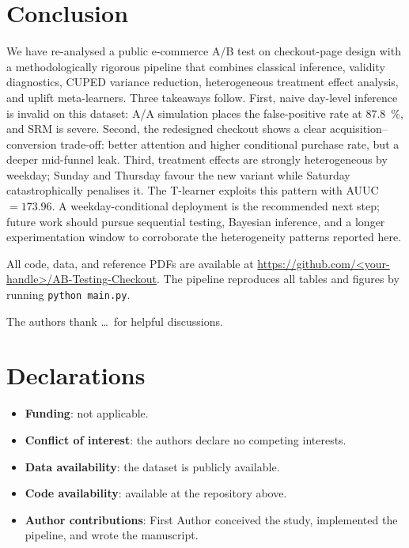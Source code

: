 \documentclass[pdflatex,sn-mathphys-num]{sn-jnl}
\theoremstyle{thmstyleone}
\theoremstyle{thmstyletwo}
\theoremstyle{thmstylethree}
\begin{document}
\section{Conclusion}\label{sec:conclusion}

We have re-analysed a public e-commerce A/B test on checkout-page design with
a methodologically rigorous pipeline that combines classical inference,
validity diagnostics, CUPED variance reduction, heterogeneous treatment effect
analysis, and uplift meta-learners.
Three takeaways follow.
First, naive day-level inference is invalid on this dataset:
A/A simulation places the false-positive rate at \SI{87.8}{\percent}, and SRM is severe.
Second, the redesigned checkout shows a clear acquisition--conversion trade-off:
better attention and higher conditional purchase rate, but a deeper mid-funnel leak.
Third, treatment effects are strongly heterogeneous by weekday;
Sunday and Thursday favour the new variant while Saturday catastrophically
penalises it. The T-learner exploits this pattern with AUUC $=173.96$.
A weekday-conditional deployment is the recommended next step;
future work should pursue sequential testing, Bayesian inference, and a longer
experimentation window to corroborate the heterogeneity patterns reported here.

\backmatter


All code, data, and reference PDFs are available at \url{https://github.com/<your-handle>/AB-Testing-Checkout}.
The pipeline reproduces all tables and figures by running \texttt{python main.py}.


The authors thank \dots\ for helpful discussions.

\section*{Declarations}
\begin{itemize}
\item \textbf{Funding}: not applicable.
\item \textbf{Conflict of interest}: the authors declare no competing interests.
\item \textbf{Data availability}: the dataset is publicly available.
\item \textbf{Code availability}: available at the repository above.
\item \textbf{Author contributions}: First Author conceived the study,
implemented the pipeline, and wrote the manuscript.
\end{itemize}


\end{document}
